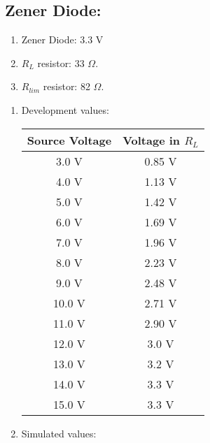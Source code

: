 \subsection{Zener Diode:}

\begin{tasks}
\begin{enumerate}
\item Zener Diode: 3.3 V
\item $R_{L}$ resistor: 33 $\Omega$.
\item $R_{lim}$ resistor: 82 $\Omega$.
\end{enumerate}

\begin{multicols}{2}
\begin{enumerate}
\item Development values:

\begin{center}
\begin{tabular}[.5cm]{ c c }
\toprule
Source Voltage & Voltage in $R_{L}$ \\
\midrule
3.0 V & 0.85 V \\
\cmidrule{1-2}
4.0 V & 1.13 V \\
\cmidrule{1-2}
5.0 V & 1.42 V \\
\cmidrule{1-2}
6.0 V & 1.69 V \\
\cmidrule{1-2}
7.0 V & 1.96 V \\
\cmidrule{1-2}
8.0 V & 2.23 V \\
\cmidrule{1-2}
9.0 V & 2.48 V \\
\cmidrule{1-2}
10.0 V & 2.71 V \\
\cmidrule{1-2}
11.0 V & 2.90 V \\
\cmidrule{1-2}
12.0 V & 3.0 V \\
\cmidrule{1-2}
13.0 V & 3.2 V \\
\cmidrule{1-2}
14.0 V & 3.3 V \\
\cmidrule{1-2}
15.0 V & 3.3 V \\
\bottomrule
\end{tabular}
\end{center} 

\item Simulated values:


\end{enumerate}
\end{multicols}
\end{tasks}
